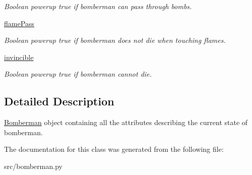 \begin{DoxyCompactItemize}
\begin{DoxyCompactList}\small\item\em Boolean powerup true if bomberman can pass through bombs. \end{DoxyCompactList}\item 
\hypertarget{classsrc_1_1bomberman_1_1_bomberman_a04139259920ddb2447a762bcbc8a53c4}{}\hyperlink{classsrc_1_1bomberman_1_1_bomberman_a04139259920ddb2447a762bcbc8a53c4}{flame\+Pass}\label{classsrc_1_1bomberman_1_1_bomberman_a04139259920ddb2447a762bcbc8a53c4}

\begin{DoxyCompactList}\small\item\em Boolean powerup true if bomberman does not die when touching flames. \end{DoxyCompactList}\item 
\hypertarget{classsrc_1_1bomberman_1_1_bomberman_a6a139150d8425b6bf1a8431a991fc0f1}{}\hyperlink{classsrc_1_1bomberman_1_1_bomberman_a6a139150d8425b6bf1a8431a991fc0f1}{invincible}\label{classsrc_1_1bomberman_1_1_bomberman_a6a139150d8425b6bf1a8431a991fc0f1}

\begin{DoxyCompactList}\small\item\em Boolean powerup true if bomberman cannot die. \end{DoxyCompactList}\end{DoxyCompactItemize}


\subsection{Detailed Description}
\hyperlink{classsrc_1_1bomberman_1_1_bomberman}{Bomberman} object containing all the attributes describing the current state of bomberman. 

The documentation for this class was generated from the following file\+:\begin{DoxyCompactItemize}
\item 
src/bomberman.\+py\end{DoxyCompactItemize}
